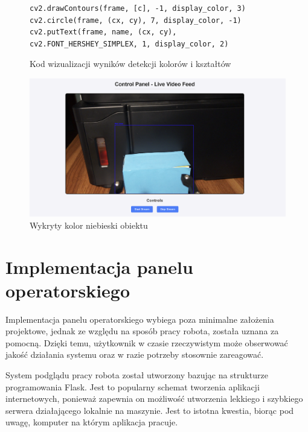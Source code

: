 \begin{figure}[H]
  \centering
  \begin{lstlisting}
cv2.drawContours(frame, [c], -1, display_color, 3)
cv2.circle(frame, (cx, cy), 7, display_color, -1)
cv2.putText(frame, name, (cx, cy), cv2.FONT_HERSHEY_SIMPLEX, 1, display_color, 2)
  \end{lstlisting}
  \caption{Kod wizualizacji wyników detekcji kolorów i kształtów}
  \label{fig:visualization}
\end{figure}

\begin{figure}[H]
  \centering
  \includegraphics[width=1.0\textwidth]{./graf/kolory.png}
  \caption{Wykryty kolor niebieski obiektu}
  \label{img:kolor-detect}
\end{figure}

\section{Implementacja panelu operatorskiego}

Implementacja panelu operatorskiego wybiega poza minimalne założenia projektowe, jednak ze względu na sposób pracy robota, została uznana za pomocną. Dzięki temu, użytkownik w czasie rzeczywistym może obserwować jakość działania systemu oraz w razie potrzeby stosownie zareagować. 

System podglądu pracy robota został utworzony bazując na strukturze programowania Flask. Jest to popularny schemat tworzenia aplikacji internetowych, ponieważ zapewnia on możliwość utworzenia lekkiego i szybkiego serwera działającego lokalnie na maszynie. Jest to istotna kwestia, biorąc pod uwagę, komputer na którym aplikacja pracuje. 

